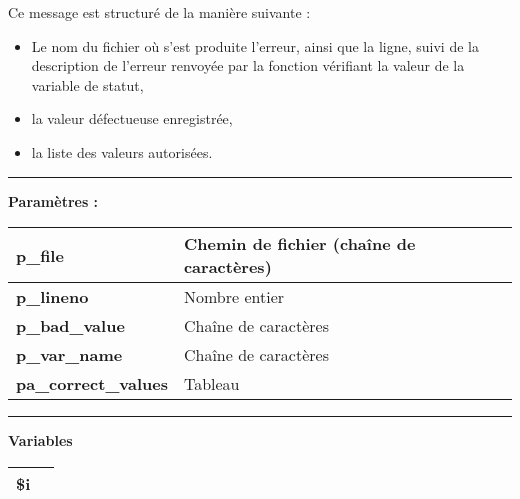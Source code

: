 \documentclass[a4paper,10pt]{article}
\begin{document}
    \begin{justify}
        Ce message est structuré de la manière suivante :

        \begin{itemize}
            \item Le nom du fichier où s'est produite l'erreur, ainsi que la ligne, suivi de la description de l'erreur renvoyée par la fonction vérifiant la valeur de la variable de statut,\setlength{\parskip}{1em}

            \item la valeur défectueuse enregistrée,

            \item la liste des valeurs autorisées.
        \end{itemize}
    \end{justify}


    \par\noindent\rule{\textwidth}{0.4pt}

    \begin{justify}
        \textbf{Paramètres :}

        \begin{tabular}{|l|l|}
            \hline
            \textbf{\color{vars}p\_file} & Chemin de fichier (chaîne de caractères)\\
            \hline
            \textbf{\color{vars}p\_lineno} & Nombre entier\\
            \hline
            \textbf{\color{vars}p\_bad\_value} & Chaîne de caractères\\
            \hline
            \textbf{\color{vars}p\_var\_name} & Chaîne de caractères\\
            \hline
            \textbf{\color{vars}pa\_correct\_values} & Tableau\\
            \hline
        \end{tabular}
    \end{justify}


    \par\noindent\rule{\textwidth}{0.4pt}

    \begin{justify}
        \textbf{Variables}

        \begin{tabular}{|l|l|}
            \hline
            \textbf{\color{vars}\$i} & \\
            \hline
        \end{tabular}
    \end{justify}
\end{document}
